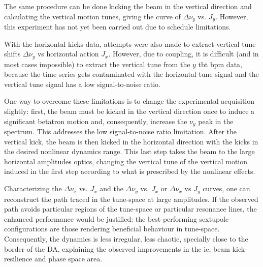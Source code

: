 The same procedure can be done kicking the beam in the vertical direction and calculating the vertical motion tunes, giving the curve of $\Delta \nu_y$ vs. $J_y$. However, this experiment has not yet been carried out due to schedule limitations.

With the horizontal kicks data, attempts were also made to extract vertical tune shifts $\Delta \nu_y$ vs horizontal action $J_x$. However, due to coupling, it is difficult (and in most cases impossible) to extract the vertical tune from the $y$ \gls*{tbt} \gls*{bpm} data, because the time-series gets contaminated with the horizontal tune signal and the vertical tune signal has a low signal-to-noise ratio. 

One way to overcome these limitations is to change the experimental acquisition slightly: first, the beam must be kicked in the vertical direction  once to induce a significant betatron motion and, consequently, increase the $\nu_y$ peak in the spectrum. This addresses the low signal-to-noise ratio limitation. After the vertical kick, the beam is then kicked in the horizontal direction with the kicks in the desired nonlinear dynamics range. This last step takes the beam to the large horizontal amplitudes optics, changing the vertical tune of the vertical motion induced in the first step according to what is prescribed by the nonlinear effects.

Characterizing the $\Delta \nu_x$ vs. $J_x$ and the $\Delta \nu_y$ vs. $J_x$ or $\Delta \nu_x$ vs $J_y$ curves, one can reconstruct the path traced in the tune-space at large amplitudes. If the observed path avoids particular regions of the tune-space or particular resonance lines, the enhanced performance would be justified: the best-performing sextupole configurations are those rendering beneficial behaviour in tune-space. Consequently, the dynamics is less irregular, less chaotic, specially close to the border of the \gls*{DA}, explaining the observed improvements in the \gls*{ie}, beam kick-resilience and phase space area.

